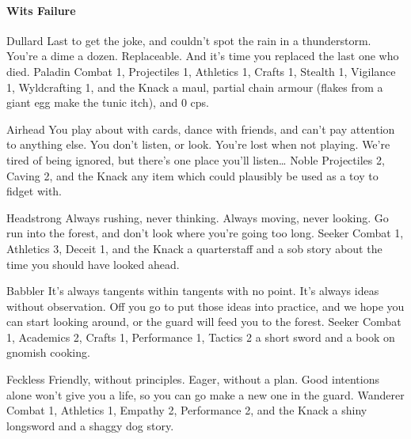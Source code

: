 \begin{multicols}{2}
\begin{itemize}
\end{itemize}

\paragraph{Wits Failure}
\begin{itemize}

  {Dullard}%
  {%
    Last to get the joke, and couldn't spot the rain in a thunderstorm.
    You're a dime a dozen.
    Replaceable.
    And it's time you replaced the last one who died.
  }%
  {Paladin}%
  {Combat 1, Projectiles 1, Athletics 1, Crafts 1, Stealth 1, Vigilance 1, Wyldcrafting 1, and the Knack \lucky}%
  {a maul, partial chain armour (flakes from a giant egg make the tunic itch), and 0 \glspl{cp}.}%

  {Airhead}%
  {You play about with cards, dance with friends, and can't pay attention to anything else.
  You don't listen, or look.
  You're lost when not playing.
  We're tired of being ignored, but there's one place you'll listen\ldots
  }%
  {Noble}%
  {Projectiles 2, Caving 2, and the Knack \unstoppable}%
  {any item which could plausibly be used as a toy to fidget with.}%

  {Headstrong}%
  {Always rushing, never thinking.
  Always moving, never looking.
  Go run into the forest, and don't look where you're going too long.
  }%
  {Seeker}%
  {Combat 1, Athletics 3, Deceit 1, and the Knack \charge}%
  {a quarterstaff and a sob story about the time you should have looked ahead.}%

  {Babbler}%
  {It's always tangents within tangents with no point.
  It's always ideas without observation.
  Off you go to put those ideas into practice, and we hope you can start looking around, or the \gls{guard} will feed you to the forest.
  }%
  {Seeker}%
  {Combat 1, Academics 2, Crafts 1, Performance 1, Tactics 2}%
  {a short sword and a book on gnomish cooking.}%

  {Feckless}%
  {Friendly, without principles.
  Eager, without a plan.
  Good intentions alone won't give you a life, so you can go make a new one in the \gls{guard}.
  }%
  {Wanderer}%
  {Combat 1, Athletics 1, Empathy 2, Performance 2, and the Knack \fasthealer}%
  {a shiny longsword and a shaggy dog story.}%


\end{itemize}
\end{multicols}
